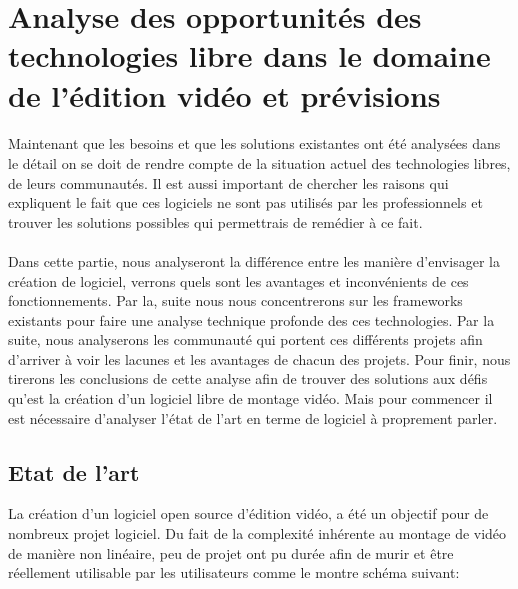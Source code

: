 \newpage \section{Analyse des opportunités des technologies libre dans
le domaine de l'édition vidéo et prévisions}

\paragraph{} Maintenant que les besoins et que les solutions existantes
ont été analysées dans le détail on se doit de rendre compte de la
situation actuel des technologies libres, de leurs communautés. Il est
aussi important de chercher les raisons qui expliquent le fait que ces
logiciels ne sont pas utilisés par les professionnels et trouver les
solutions possibles qui permettrais de remédier à ce fait.

\paragraph{} Dans cette partie, nous analyseront la différence entre les
manière d'envisager la création de logiciel, verrons quels sont les
avantages et inconvénients de ces fonctionnements. Par la, suite nous
nous concentrerons sur les frameworks existants pour faire une analyse
technique profonde des ces technologies. Par la suite, nous analyserons
les communauté qui portent ces différents projets afin d'arriver à
voir les lacunes et les avantages de chacun des projets.  Pour finir,
nous tirerons les conclusions de cette analyse afin de trouver des
solutions aux défis qu'est la création d'un logiciel libre de montage
vidéo. Mais pour commencer il est nécessaire d'analyser l'état de
l'art en terme de logiciel à proprement parler.

\subsection{Etat de l'art}

La création d'un logiciel open source d'édition vidéo, a été un
objectif pour de nombreux projet logiciel. Du fait de la complexité
inhérente au montage de vidéo de manière non linéaire, peu de projet
ont pu durée afin de murir et être réellement utilisable par les
utilisateurs comme le montre schéma suivant:

